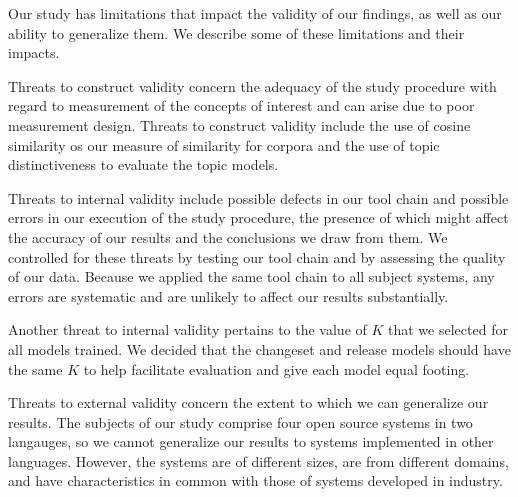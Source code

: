 
Our study has limitations that impact the validity of our findings,
as well as our ability to generalize them.
We describe some of these limitations and their impacts.

Threats to construct validity concern the adequacy of the study procedure with regard to
measurement of the concepts of interest and can arise due to poor measurement design.
Threats to construct validity include the use of cosine similarity os our measure of similarity for corpora
and the use of topic distinctiveness to evaluate the topic models.

Threats to internal validity include possible defects in our tool chain and possible errors
in our execution of the study procedure,
the presence of which might affect the accuracy of our results and the conclusions we draw from them.
We controlled for these threats by testing our tool chain and by assessing the quality of our data.
Because we applied the same tool chain to all subject systems, any errors are systematic and are unlikely
to affect our results substantially.

Another threat to internal validity pertains to the value of $K$ that we selected for all models trained.
We decided that the changeset and release models should have the same $K$
to help facilitate evaluation and give each model equal footing.

Threats to external validity concern the extent to which we can generalize our results.
The subjects of our study comprise four open source systems in two langauges,
so we cannot generalize our results to systems implemented in other languages.
However, the systems are of different sizes, are from different domains, and
have characteristics in common with those of systems developed in industry.

